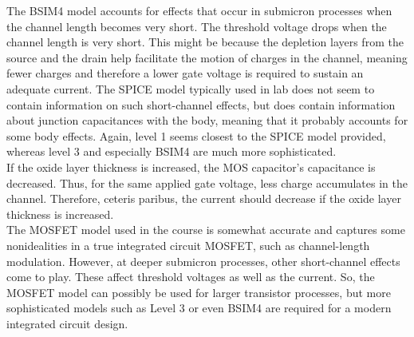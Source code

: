 \FloatBarrier

The BSIM4 model accounts for effects that occur in submicron processes when the channel length becomes very short.
The threshold voltage drops when the channel length is very short.
This might be because the depletion layers from the source and the drain help facilitate the motion of charges in the channel, meaning fewer charges and therefore a lower gate voltage is required to sustain an adequate current.
The SPICE model typically used in lab does not seem to contain information on such short-channel effects, but does contain information about junction capacitances with the body, meaning that it probably accounts for some body effects.
Again, level 1 seems closest to the SPICE model provided, whereas level 3 and especially BSIM4 are much more sophisticated. \\

If the oxide layer thickness is increased, the MOS capacitor's capacitance is decreased.
Thus, for the same applied gate voltage, less charge accumulates in the channel.
Therefore, ceteris paribus, the current should decrease if the oxide layer thickness is increased. \\

The MOSFET model used in the course is somewhat accurate and captures some nonidealities in a true integrated circuit MOSFET, such as channel-length modulation.
However, at deeper submicron processes, other short-channel effects come to play. These affect threshold voltages as well as the current.
So, the MOSFET model can possibly be used for larger transistor processes, but more sophisticated models such as Level 3 or even BSIM4 are required for a modern integrated circuit design.

\FloatBarrier

